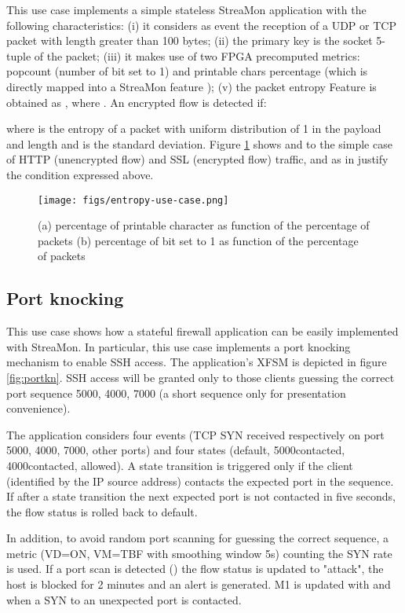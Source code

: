 \documentclass[conference,letterpaper]{sig-alternate-10pt}
\begin{document}
This use case implements a simple stateless StreaMon application with the following characteristics: (i) it considers as event the reception of a UDP or TCP packet with length greater than 100 bytes; (ii) the primary key is the socket 5-tuple of the packet; (iii) it makes use of two FPGA precomputed  metrics: popcount (number of bit set to 1)  and printable chars percentage  (which is directly mapped into a StreaMon feature ); (v) the packet entropy Feature  is obtained as , where . An encrypted flow is detected if: 

where  is the entropy of a packet with uniform distribution of 1 in the payload and length   and  is the standard deviation. Figure \ref{fig:entropy} shows  and  to the simple case of HTTP (unencrypted flow) and SSL (encrypted flow) traffic, and as in \cite{entropy} justify the condition expressed above. 

\begin{figure}[t]
	\centering
	\texttt{[image: figs/entropy-use-case.png]}
	\caption{(a) percentage of printable character as function of the percentage of packets (b) percentage of bit set to 1 as function of the percentage of packets}
	\vspace*{-.5cm}
	\label{fig:entropy}
\end{figure}

\subsection{Port knocking}
\label{s:pknock}
This use case shows how a stateful firewall application can be easily implemented with StreaMon. In particular, this use case implements a port knocking mechanism to enable SSH access. The application's XFSM is depicted in figure \ref{fig:portkn}. SSH access will be granted only to those clients guessing the correct port sequence 5000, 4000, 7000  (a short sequence only for presentation convenience).

The application considers four events (TCP SYN received respectively on port 5000, 4000, 7000, other ports) and four states (default, 5000contacted, 4000contacted, allowed). A state transition is triggered only if the client (identified by the IP source address) contacts the expected port in the sequence. If after a state transition the next expected port is not contacted in five seconds, the flow status is rolled back to default. 

In addition, to avoid random port scanning for guessing the correct sequence, a metric  (VD=ON, VM=TBF with smoothing window 5s) counting the SYN rate is used. If a port scan is detected () the flow status is updated to "attack", the host is blocked for 2 minutes and an alert is generated. M1 is updated with  and  when a SYN to an unexpected port is contacted.
\end{document}
